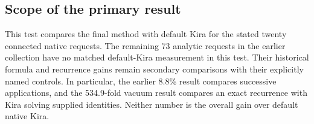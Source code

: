 

\subsection{Scope of the primary result}
This test compares the final method with default Kira for the stated twenty connected native requests. The remaining 73 analytic requests in the earlier collection have no matched default-Kira measurement in this test. Their historical formula and recurrence gains remain secondary comparisons with their explicitly named controls. In particular, the earlier 8.8\% result compares successive applications, and the 534.9-fold vacuum result compares an exact recurrence with Kira solving supplied identities. Neither number is the overall gain over default native Kira.
